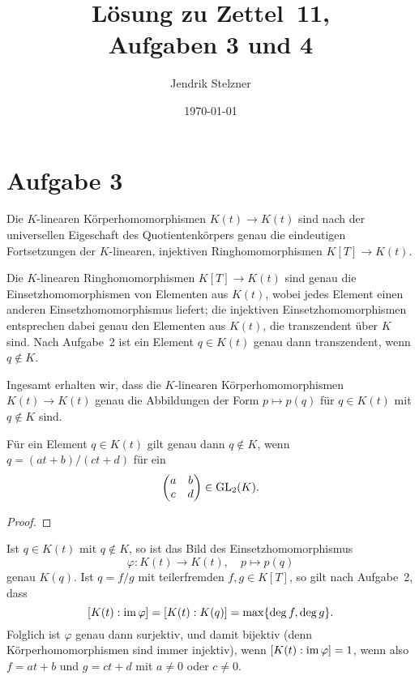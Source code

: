 \documentclass[a4paper,10pt,numbers=noenddot]{scrartcl}
\title{Lösung zu Zettel~11, \\ Aufgaben 3 und 4}
\author{Jendrik Stelzner}
\date{\today}
\begin{document}
\maketitle



\section{Aufgabe 3}

Die $K$-linearen Körperhomomorphismen $K(t) \to K(t)$ sind nach der universellen Eigeschaft des Quotientenkörpers genau die eindeutigen Fortsetzungen der $K$-linearen, injektiven Ringhomomorphismen $K[T] \to K(t)$.

Die $K$-linearen Ringhomomorphismen $K[T] \to K(t)$ sind genau die Einsetzhomomorphismen von Elementen aus $K(t)$, wobei jedes Element einen anderen Einsetzhomomorphismus liefert; die injektiven Einsetzhomomorphismen entsprechen dabei genau den Elementen aus $K(t)$, die transzendent über $K$ sind.
Nach Aufgabe~2 ist ein Element $q \in K(t)$ genau dann transzendent, wenn $q \notin K$.

Ingesamt erhalten wir, dass die $K$-linearen Körperhomomorphismen $K(t) \to K(t)$ genau die Abbildungen der Form $p \mapsto p(q)$ für $q \in K(t)$ mit $q \notin K$ sind.

\begin{claim}
  Für ein Element $q \in K(t)$ gilt genau dann $q \notin K$, wenn $q = (at+b)/(ct+d)$ für ein
  \[
    \begin{pmatrix}
      a & b
      \\
      c & d
    \end{pmatrix}
    \in \operatorname{GL}_2(K).
  \]
\end{claim}
\begin{proof}
  
\end{proof}


Ist $q \in K(t)$ mit $q \notin K$, so ist das Bild des Einsetzhomomorphismus
\[
  \varphi \colon K(t) \to K(t),
  \quad
  p \mapsto p(q)
\]
genau $K(q)$.
Ist $q = f/g$ mit teilerfremden $f, g \in K[T]$, so gilt nach Aufgabe~2, dass
\[
    [K(t) : \operatorname{im} \varphi]
  = [K(t) : K(q)]
  = \max\{ \deg f, \deg g \}.
\]
Folglich ist $\varphi$ genau dann surjektiv, und damit bijektiv (denn Körperhomomorphismen sind immer injektiv), wenn $[K(t) : \operatorname{im} \varphi] = 1$, wenn also $f = at+b$ und $g = ct+d$ mit $a \neq 0$ oder $c \neq 0$.
\end{document}
